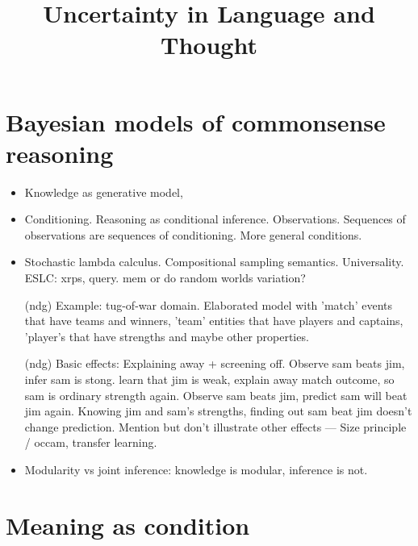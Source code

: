 \documentclass[12pt]{article}
\title{Uncertainty in Language and Thought}
\begin{document}


\maketitle

\abstract{}


\pagebreak

\tableofcontents

\pagebreak



\section{Bayesian models of commonsense reasoning}
\begin{itemize}

\item  Knowledge as generative model, 
  
\item  Conditioning. Reasoning as conditional inference. Observations. Sequences of observations are sequences of conditioning. More general conditions.
  
\item  Stochastic lambda calculus. Compositional sampling semantics. Universality. 
\subitem ESLC: xrps, query. mem or do random worlds variation?
  
\item [(ndg)]  Example: tug-of-war domain. Elaborated model with 'match' events that have teams and winners, 'team' entities that have players and captains, 'player's that have strengths and maybe other properties. 
  
\item [(ndg)]  Basic effects: Explaining away + screening off. 
\subitem  Observe sam beats jim, infer sam is stong. learn that jim is weak, explain away match outcome, so sam is ordinary strength again.
\subitem  Observe sam beats jim, predict sam will beat jim again. Knowing jim and sam's strengths, finding out sam beat jim doesn't change prediction. 
\subitem   Mention but don't illustrate other effects ---  Size principle / occam, transfer learning.
  
\item  Modularity vs joint inference: knowledge is modular, inference is not.
  
\end{itemize}
 
 
 
\section{Meaning as condition}
 
\end{document}

